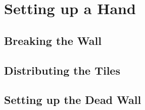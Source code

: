 \section{Setting up a Hand}\label{core:sec:hand}

\subsection{Breaking the Wall}

\subsection{Distributing the Tiles}

\subsection{Setting up the Dead Wall}
